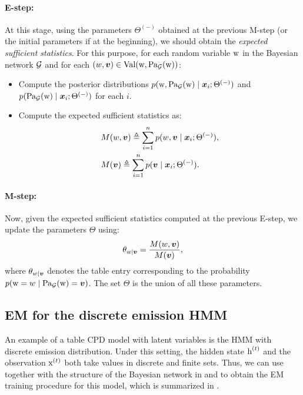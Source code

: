 \paragraph{E-step:} At this stage, using the parameters $\Theta^{(-)}$ obtained at the previous M-step (or the initial parameters if at the beginning), we should obtain the \emph{expected sufficient statistics}. For this purpose, for each random variable ${\textnormal{w}}$ in the Bayesian network ${\mathcal{G}}$ and for each $(w,{\bm{v}}) \in \mathrm{Val}({\textnormal{w}},\mathrm{Pa}_{\mathcal{G}}({\textnormal{w}}))$:
\begin{itemize}
    \item Compute the posterior distributions $p({\textnormal{w}},\mathrm{Pa}_{\mathcal{G}}({\textnormal{w}}) \mid {\bm{x}}_i; \Theta^{(-)})$ and $p(\mathrm{Pa}_{\mathcal{G}}({\textnormal{w}}) \mid {\bm{x}}_i; \Theta^{(-)})$ for each $i$.
    \item Compute the expected sufficient statistics as:
     \begin{align}
         &M(w,{\bm{v}}) \triangleq \sum_{i=1}^n p(w,{\bm{v}} \mid {\bm{x}}_i; \Theta^{(-)}), \label{eq:joint_suf_stat}\\
         &M({\bm{v}}) \triangleq \sum_{i=1}^n p({\bm{v}} \mid {\bm{x}}_i; \Theta^{(-)}). \label{eq:marginal_suf_stat}
     \end{align}
\end{itemize}

\paragraph{M-step:} Now, given the expected sufficient statistics computed at the previous E-step, we update the parameters $\Theta$ using:
\begin{equation}
    \theta_{w \mid {\bm{v}}} = \frac{M(w,{\bm{v}})}{M({\bm{v}})},
\end{equation}
where $\theta_{w \mid {\bm{v}}}$ denotes the table entry corresponding to the probability $p({\textnormal{w}}=w \mid \mathrm{Pa}_{\mathcal{G}}({\textnormal{w}})={\bm{v}})$. The set $\Theta$ is the union of all these parameters.

\subsection{EM for the discrete emission HMM}
An example of a table CPD model with latent variables is the HMM with discrete emission distribution. Under this setting, the hidden state ${\textnormal{h}}^{(t)}$ and the observation ${\textnormal{x}}^{(t)}$ both take values in discrete and finite sets. Thus, we can use  together with the structure of the Bayesian network in  and  to obtain the EM training procedure for this model, which is summarized in .

